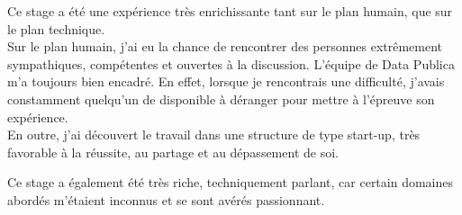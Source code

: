 Ce stage a été une expérience très enrichissante tant sur le plan humain, que sur le plan technique.\\

Sur le plan humain, j'ai eu la chance de rencontrer des personnes extrêmement sympathiques, compétentes et ouvertes à la discussion. L'équipe de Data Publica m'a toujours bien encadré. En effet, lorsque je rencontrais une difficulté, j'avais constamment quelqu'un de disponible à déranger pour mettre à l'épreuve son expérience.\\

 En outre, j'ai découvert le travail dans une structure de type start-up, très favorable à la réussite, au partage et au dépassement de soi.

Ce stage a également été très riche, techniquement parlant, car certain domaines abordés m'étaient inconnus et se sont avérés passionnant.